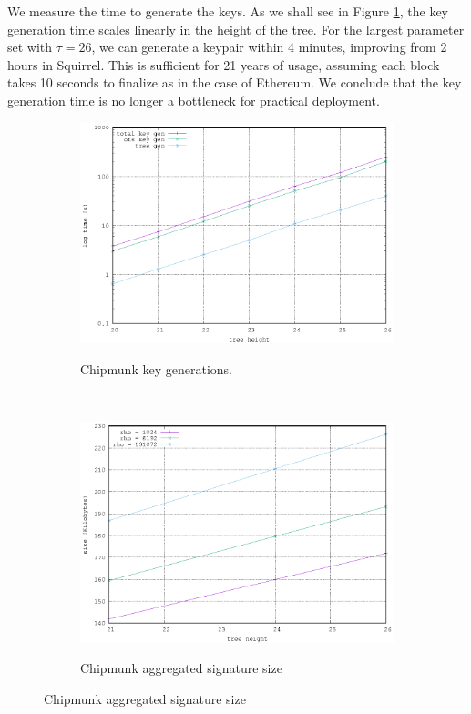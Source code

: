 We measure the time to generate the keys. As we shall see in Figure \ref{fig:keygen}, the key generation time scales linearly in the 
height of the tree. For the largest parameter set with $\tau = 26$, we can generate a keypair within 4 minutes, improving from 2 hours in Squirrel.
This is sufficient for 21 years of usage, assuming each block takes 10 seconds to finalize as in the case of Ethereum. 
We conclude that the key generation time is no longer a bottleneck for practical deployment.
\begin{figure}[H] 
  \centering
  \begin{subfigure}[b]
  {0.45\textwidth}    \centering
  \includegraphics[width=\textwidth]{figures/key_gen.eps}\\
  \caption{Chipmunk key generations.}
  \label{fig:keygen}
  \end{subfigure}
~
\begin{subfigure}[b]{0.45\textwidth}    \centering
  \includegraphics[width=\textwidth]{figures/sig_size.eps}\\
  \caption{Chipmunk aggregated signature size}
  \label{fig:sigize}
  \end{subfigure}

\end{figure}



